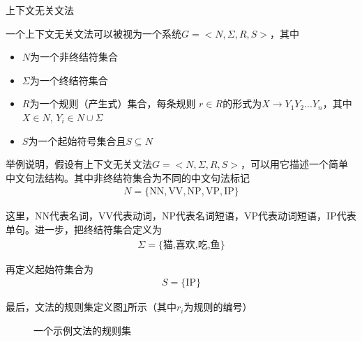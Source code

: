 \vspace{0.5em}
\begin{definition} 上下文无关文法

一个上下文无关文法可以被视为一个系统$G=<N,\Sigma,R,S>$，其中

\begin{itemize}
\vspace{0.5em}
\item $N$为一个非终结符集合
\vspace{0.5em}
\item $\Sigma$为一个终结符集合
\vspace{0.5em}
\item $R$为一个规则（产生式）集合，每条规则 $r \in R$的形式为$X \to Y_1Y_2...Y_n$，其中$X \in N$, $Y_i \in N \cup \Sigma$
\vspace{0.5em}
\item $S$为一个起始符号集合且$S \subseteq N$
\vspace{0.5em}
\end{itemize}
\end{definition}

\parinterval 举例说明，假设有上下文无关文法$G=<N,\Sigma,R,S>$，可以用它描述一个简单中文句法结构。其中非终结符集合为不同的中文句法标记
\begin{eqnarray}
N=\{\textrm{NN},\textrm{VV},\textrm{NP},\textrm{VP},\textrm{IP}\} \nonumber
\label{eq:2-42}
\end{eqnarray}

这里，\textrm{NN}代表名词，\textrm{VV}代表动词，\textrm{NP}代表名词短语，\textrm{VP}代表动词短语，\textrm{IP}代表单句。进一步，把终结符集合定义为
\begin{eqnarray}
\Sigma = \{\text{猫,喜欢,吃,鱼}\} \nonumber
\label{eq:2-43}
\end{eqnarray}

再定义起始符集合为
\begin{eqnarray}
S=\{\textrm{IP}\} \nonumber
\label{eq:2-44}
\end{eqnarray}

最后，文法的规则集定义图\ref{fig:2-21}所示（其中$r_i$为规则的编号）

\begin{figure}[htp]
    \centering

\caption{一个示例文法的规则集}
    \label{fig:2-21}
\end{figure}

